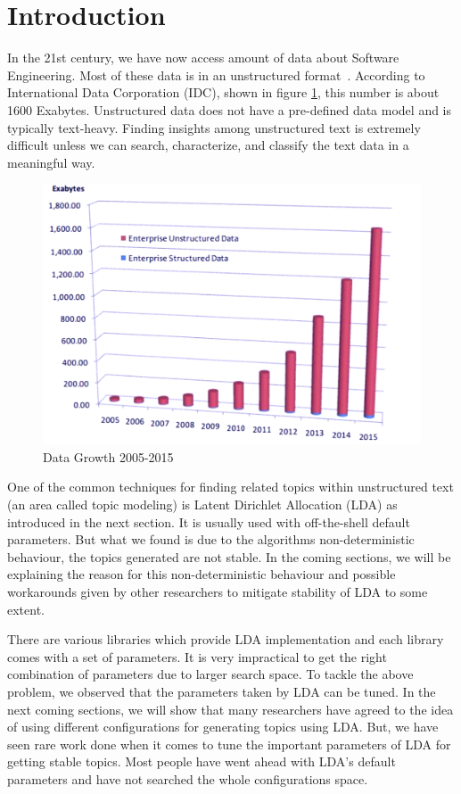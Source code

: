 \documentclass[conference]{IEEEtran}
\theoremstyle{break}
\begin{document}
\section{Introduction}
\label{sect: intro}
In the 21st century, we have now access amount of data about Software Engineering. Most of these data is in an unstructured format~\cite{nadkarni2014structured}. According to International Data Corporation (IDC), shown in figure \ref{fig: data}, this number is about 1600 Exabytes. Unstructured data does not have a pre-defined data model and is typically text-heavy. Finding insights among unstructured text is extremely difficult unless we can search, characterize, and classify the text data in a meaningful way.

\begin{figure}[!htpb]
  \captionsetup{justification=centering}
  \includegraphics[width=\linewidth]{./fig/data.png}
  \caption{Data Growth 2005-2015}
  \label{fig: data}
\end{figure}

One of the common techniques for finding related topics within unstructured text (an area called topic modeling) is Latent Dirichlet Allocation (LDA) as introduced in the next section. It is usually used with off-the-shell default parameters. But what we found is due to the algorithms non-deterministic behaviour, the topics generated are not stable. In the coming sections, we will be explaining the reason for this non-deterministic behaviour and possible workarounds given by other researchers to mitigate stability of LDA to some extent.

There are various libraries which provide LDA implementation and each library comes with a set of parameters. It is very impractical to get the right combination of parameters due to larger search space. To tackle the above problem, we observed that the parameters taken by LDA can be tuned. In the next coming sections, we will show that many researchers have agreed to the idea of using different configurations for generating topics using LDA. But, we have seen rare work done when it comes to tune the important parameters of LDA for getting stable topics. Most people have went ahead with LDA’s default parameters and have not searched the whole configurations space.
\end{document}
